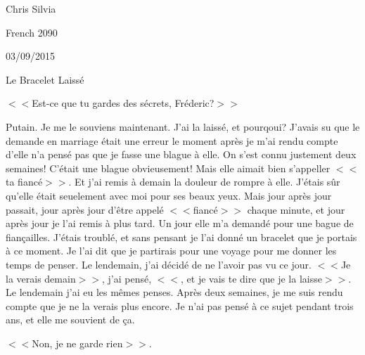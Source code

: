 \documentclass{article}
\begin{document}
\begin{flushright}
Chris Silvia

French 2090

03/09/2015
\end{flushright}

\begin{center}
Le Bracelet Laissé
\end{center}


\begin{doublespace}

$<<$Est-ce que tu gardes des sécrets, Fréderic?$>>$

Putain. 
Je me le souviens maintenant.
J'ai la laissé, et pourqoui?
J'avais su que le demande en marriage était une erreur
	le moment après je m'ai rendu compte d'elle 
	n'a pensé pas que je fasse une blague à elle.
On s'est connu justement deux semaines!
C'était une blague obvieusement!
Mais elle aimait bien s'appeller $<<$ta fiancé$>>$.
Et j'ai remis à demain la douleur de rompre à elle.
J'étais sûr qu'elle était seuelement avec moi pour ses 
	beaux yeux.
Mais jour après jour passait, jour après jour d'être
	appelé $<<$fiancé$>>$ chaque minute, et jour après
	jour je l'ai remis à plus tard.
Un jour elle m'a demandé pour une bague de fiançailles.
J'étais troublé, et sans pensant je l'ai donné un bracelet
	que je portais à ce moment.
Je l'ai dit que je partirais pour une voyage pour me
	donner les temps de penser.
Le lendemain, j'ai décidé de ne l'avoir pas vu ce jour.
$<<$Je la verais demain$>>$, j'ai pensé, $<<$, et je vais
	te dire que je la laisse$>>$.
Le lendemain j'ai eu les mêmes penses.
Après deux semaines, je me suis rendu compte que je
	ne la verais plus encore.
Je n'ai pas pensé à ce sujet pendant trois ans, et elle
	me souvient de ça.

$<<$Non, je ne garde rien$>>$.

\end{doublespace}
\end{document}
